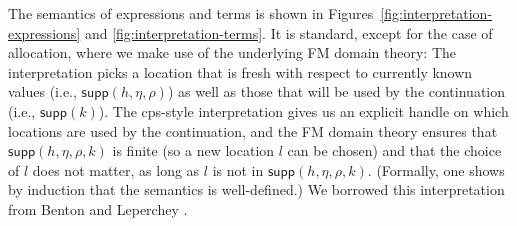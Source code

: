 \documentclass{LMCS}
\newcommand{\supp}{\mathsf{supp}}
\begin{document}
The semantics of expressions and terms is 
shown in Figures~\ref{fig:interpretation-expressions}
and \ref{fig:interpretation-terms}.
It is standard, except for the case of allocation, 
where we make use of the underlying FM domain theory:
The interpretation 
picks a location that is fresh with respect to
currently known values (i.e., $\supp(h,\eta,\rho)$)
as well as those that will be used by the continuation
(i.e., $\supp(k)$).  The cps-style
interpretation gives us an explicit handle on which
locations are used by the continuation, and
the FM domain theory ensures that
$\supp(h,\eta,\rho,k)$ is finite (so a new location $l$ can be chosen)
and that the choice of $l$ does not matter, as long as $l$ is not
in $\supp(h,\eta,\rho,k)$. (Formally, one shows by induction that
the semantics is well-defined.) We borrowed this interpretation from
Benton and Leperchey \cite{benton}.
\end{document}
